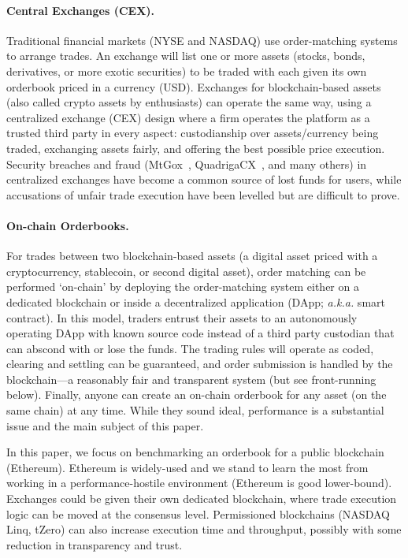 \paragraph{Central Exchanges (CEX).} Traditional financial markets (\eg NYSE and NASDAQ) use order-matching systems to arrange trades. An exchange will list one or more assets (stocks, bonds, derivatives, or more exotic securities) to be traded with each given its own orderbook priced in a currency (\eg USD). Exchanges for blockchain-based assets (also called crypto assets by enthusiasts) can operate the same way, using a centralized exchange (CEX) design where a firm operates the platform as a trusted third party in every aspect: custodianship over assets/currency being traded, exchanging assets fairly, and offering the best possible price execution. Security breaches and fraud (\eg MtGox~\cite{TheHisto45:online}, QuadrigaCX~\cite{SEBIOrde83:online}, and many others) in centralized exchanges have become a common source of lost funds for users, while accusations of unfair trade execution have been levelled but are difficult to prove. 

\paragraph{On-chain Orderbooks.} For trades between two blockchain-based assets (\eg a digital asset priced with a cryptocurrency, stablecoin, or second digital asset), order matching can be performed `on-chain' by deploying the order-matching system either on a dedicated blockchain or inside a decentralized application (DApp; \textit{a.k.a.} smart contract). In this model, traders entrust their assets to an autonomously operating DApp with known source code instead of a third party custodian that can abscond with or lose the funds. The trading rules will operate as coded, clearing and settling can be guaranteed, and order submission is handled by the blockchain---a reasonably fair and transparent system (but see front-running below). Finally, anyone can create an on-chain orderbook for any asset (on the same chain) at any time. While they sound ideal, performance is a substantial issue and the main subject of this paper. 

In this paper, we focus on benchmarking an orderbook for a public blockchain (\eg Ethereum). Ethereum is widely-used and we stand to learn the most from working in a performance-hostile environment (\ie Ethereum is good lower-bound). Exchanges could be given their own dedicated blockchain, where trade execution logic can be moved at the consensus level. Permissioned blockchains (\eg NASDAQ Linq, tZero) can also increase execution time and throughput, possibly with some reduction in transparency and trust.

